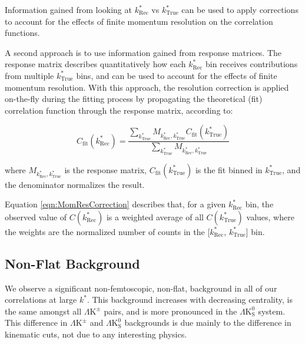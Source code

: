 \documentclass[ALICE,manyauthors]{cernphprep}
\newcommand{\kstar}{$k^{*}$\xspace}
\newcommand{\ktrue}{$k^{*}_{\mathrm{True}}$\xspace}
\newcommand{\krec}{$k^{*}_{\mathrm{Rec}}$\xspace}
\newcommand{\LamKpm}{$\Lambda\mathrm{K^{\pm}}$\xspace}
\newcommand{\LamKs}{$\Lambda\mathrm{K^{0}_{S}}$\xspace}
\begin{document}
Information gained from looking at \krec vs \ktrue can be used to apply corrections to account for the effects of finite momentum resolution on the correlation functions.



A second approach is to use information gained from response matrices.
The response matrix describes quantitatively how each \krec bin receives contributions from multiple \ktrue bins, and can be used to account for the effects of finite momentum resolution.
With this approach, the resolution correction is applied on-the-fly during the fitting process by propagating the theoretical (fit) correlation function through the response matrix, according to:  

\begin{equation}
  C_{\mathrm{fit}}(k^{*}_{\mathrm{Rec}}) = \dfrac{\sum\limits_{k^{*}_{\mathrm{True}}}M_{k^{*}_{\mathrm{Rec}},k^{*}_{\mathrm{True}}}C_{\mathrm{fit}}(k^{*}_{\mathrm{True}})}{\sum\limits_{k^{*}_{\mathrm{True}}}M_{k^{*}_{\mathrm{Rec}},k^{*}_{\mathrm{True}}}}
\label{eqn:MomResCorrection}
\end{equation}

where $M_{k^{*}_{\mathrm{Rec}},k^{*}_{\mathrm{True}}}$ is the response matrix, $C_{\mathrm{fit}}(k^{*}_{\mathrm{True}})$ is the fit binned in \ktrue, and the denominator normalizes the result.

Equation \ref{eqn:MomResCorrection} describes that, for a given \krec bin, the observed value of $C(k^{*}_{\mathrm{Rec}})$ is a weighted average of all $C(k^{*}_{\mathrm{True}})$ values, where the weights are the normalized number of counts in the [\krec, \ktrue] bin.



\subsection{Non-Flat Background}
\label{NonFlatBackground}

We observe a significant non-femtoscopic, non-flat, background in all of our correlations at large \kstar.  
This background increases with decreasing centrality, is the same amongst all \LamKpm pairs, and is more pronounced in the \LamKs system.
This difference in \LamKpm and \LamKs backgrounds is due mainly to the difference in kinematic cuts, not due to any interesting physics.  
\end{document}
